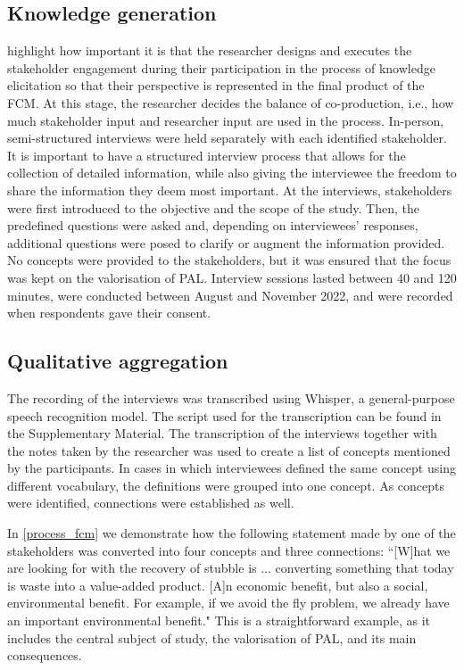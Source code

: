 \subsection{Knowledge generation}

\cite{edwards2021building} highlight how important it is that the researcher designs and executes the stakeholder engagement during their participation in the process of knowledge elicitation so that their perspective is represented in the final product of the FCM. At this stage, the researcher decides the balance of co-production, i.e., how much stakeholder input and researcher input are used in the process. In-person, semi-structured interviews were held separately with each identified stakeholder. It is important to have a structured interview process that allows for the collection of detailed information, while also giving the interviewee the freedom to share the information they deem most important. At the interviews, stakeholders were first introduced to the objective and the scope of the study. Then, the predefined questions were asked and, depending on interviewees' responses, additional questions were posed to clarify or augment the information provided. No concepts were provided to the stakeholders, but it was ensured that the focus was kept on the valorisation of PAL. Interview sessions lasted between 40 and 120 minutes, were conducted between August and November 2022, and were recorded when respondents gave their consent. 

\subsection{Qualitative aggregation}

The recording of the interviews was transcribed using Whisper, a general-purpose speech recognition model. The script used for the transcription can be found in the Supplementary Material. The transcription of the interviews together with the notes taken by the researcher was used to create a list of concepts mentioned by the participants. In cases in which interviewees defined the same concept using different vocabulary, the definitions were grouped into one concept. As concepts were identified, connections were established as well. 

In \cref{process_fcm} we demonstrate how the following statement made by one of the stakeholders was converted into four concepts and three connections: ``[W]hat we are looking for with the recovery of stubble is ... converting something that today is waste into a value-added product. [A]n economic benefit, but also a social, environmental benefit. For example, if we avoid the fly problem, we already have an important environmental benefit." This is a straightforward example, as it includes the central subject of study, the valorisation of PAL, and its main consequences. 


